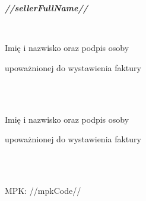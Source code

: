 \documentclass[12pt]{article}
\begin{document}
    \begin{small}
        \begin{minipage}[t]{.4\textwidth}
            \centerline{
                \textbf{\emph{//sellerFullName//}
                }}
            \ \\
            \vspace{-4ex}
            \hline
            \vspace{.5ex}
            \scriptsize{
                \centerline{Imię i nazwisko oraz podpis osoby}
                \centerline{upoważnionej do wystawienia faktury}
            }
        \end{minipage}
        \hfill
        \begin{minipage}[t]{.4\textwidth}
            \ \\ \\
            \vspace{-4ex}
            \hline
            \vspace{.5ex}
            \scriptsize{
                \centerline{Imię i nazwisko oraz podpis osoby}
                \centerline{upoważnionej do wystawienia faktury}
            }
        \end{minipage}

        \ \\
        \ \\

        \begin{small}
            \small{\centerline{{MPK: //mpkCode//}}}
        \end{small}


    \end{small}
\end{document}
